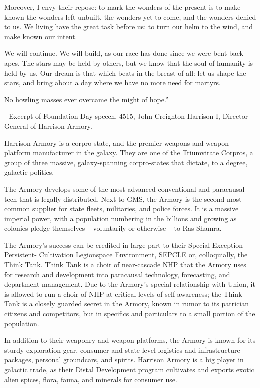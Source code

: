          Moreover, I envy their repose: to mark the wonders of the present is to make known the
         wonders left unbuilt, the wonders yet-to-come, and the wonders denied to us. We living
         have the great task before us: to turn our helm to the wind, and make known our intent.

         We will continue. We will build, as our race has done since we were bent-back apes. The
         stars may be held by others, but we know that the soul of humanity is held by us. Our
         dream is that which beats in the breast of all: let us shape the stars, and bring about a day
         where we have no more need for martyrs.

         No howling masses ever overcame the might of hope.”

                      -   Excerpt of Foundation Day speech, 4515, John Creighton Harrison I,
                          Director-General of Harrison Armory.

Harrison Armory is a corpro-state, and the premier weapons and weapon-platform manufacturer
in the galaxy. They are one of the Triumvirate Corpros, a group of three massive, galaxy-spanning
corpro-states that dictate, to a degree, galactic politics.




The Armory develops some of the most advanced conventional and paracausal tech that is legally
distributed. Next to GMS, the Armory is the second most common supplier for state fleets,
militaries, and police forces. It is a massive imperial power, with a population numbering in the
billions and growing as colonies pledge themselves -- voluntarily or otherwise -- to Ras Shamra.

The Armory’s success can be credited in large part to their Special-Exception Persistent-
Cultivation Legionspace Environment, SEPCLE or, colloquially, the Think Tank. Think Tank is a
choir of near-cascade NHP that the Armory uses for research and development into paracausal
technology, forecasting, and department management. Due to the Armory’s special relationship
with Union, it is allowed to run a choir of NHP at critical levels of self-awareness; the Think Tank is
a closely guarded secret in the Armory, known in rumor to its patrician citizens and competitors,
but in specifics and particulars to a small portion of the population.

In addition to their weaponry and weapon platforms, the Armory is known for its sturdy exploration
gear, consumer and state-level logistics and infrastructure packages, personal groundcars, and
spirits. Harrison Armory is a big player in galactic trade, as their Distal Development program
cultivates and exports exotic alien spices, flora, fauna, and minerals for consumer use.

